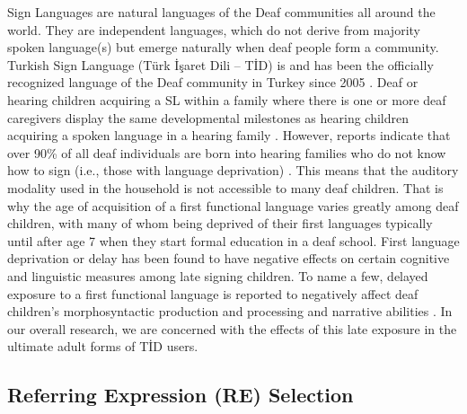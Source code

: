 \documentclass[review]{elsarticle} %
\begin{document}
Sign Languages are natural languages of the Deaf communities all around
the world. They are independent languages, which do not derive from
majority spoken language(s) but emerge naturally when deaf people form a
community. Turkish Sign Language (Türk İşaret Dili -- TİD) is and has
been the officially recognized language of the Deaf community in Turkey
since 2005 \citep[see][ for a brief review of the historical development
of the language]{nuhbalaoglu2018}. Deaf or hearing children acquiring a
SL within a family where there is one or more deaf caregivers display
the same developmental milestones as hearing children acquiring a spoken
language in a hearing family
\citep{chamberlain_language_1999, meier1990}. However, reports indicate
that over 90\% of all deaf individuals are born into hearing families
who do not know how to sign (i.e., those with language deprivation)
\citep{woll2013}. This means that the auditory modality used in the
household is not accessible to many deaf children. That is why the age
of acquisition of a first functional language varies greatly among deaf
children, with many of whom being deprived of their first languages
typically until after age 7 when they start formal education in a deaf
school. First language deprivation or delay has been found to have
negative effects on certain cognitive and linguistic measures among late
signing children. To name a few, delayed exposure to a first functional
language is reported to negatively affect deaf children's
morphosyntactic production and processing
\citep{kayabasi2020, boudreault2006, newport1990, cheng2021, karadoller2017, cormier2012}
and narrative abilities \citep[e.g.,][]{becker2009}. In our overall
research, we are concerned with the effects of this late exposure in the
ultimate adult forms of TİD users.

\hypertarget{referring-expression-re-selection}{%
\subsection{Referring Expression (RE)
Selection}\label{referring-expression-re-selection}}
\end{document}

